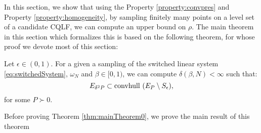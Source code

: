 In this section, we show that using the Property \ref{property:convpres} and Property \ref{property:homogeneity}, by sampling finitely many points on a level set of a candidate CQLF, we can compute an upper bound on $\rho$. The main theorem in this section which formalizes this is based on the following theorem, for whose proof we devote most of this section:

\begin{theorem} \label{thm:mainTheorem0} Let $\epsilon \in (0,1)$. For a given a sampling of the switched linear system \eqref{eq:switchedSystem}, $\omega_N$ and $\beta \in [0,1)$, we can compute $\delta(\beta, N) < \infty$ such that:
\begin{equation}E_{\delta^2P} \subset  \mbox{convhull } (E_P\setminus S_\epsilon),
\end{equation}
for some $P \succ 0$.
\end{theorem}

Before proving Theorem \ref{thm:mainTheorem0}, we prove the main result of this theorem

